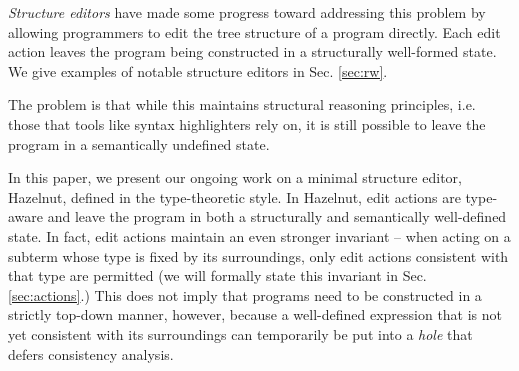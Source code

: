 

\emph{Structure editors} have made some progress toward addressing this
problem by allowing programmers to edit the tree structure of a program
directly. Each edit action leaves the program being constructed in a
structurally well-formed state. We give examples of notable structure editors in Sec. \ref{sec:rw}.  

The problem is that while this maintains structural
reasoning principles, i.e. those that tools like syntax highlighters rely
on, it is still possible to leave the program in a semantically undefined state.


In this paper, we present our ongoing work on a minimal structure editor, Hazelnut,  defined in the type-theoretic style. In Hazelnut, edit actions are type-aware and leave the program in both a structurally and semantically well-defined state. In fact, edit actions maintain an even stronger invariant -- when acting on a subterm whose type is fixed by its surroundings, only edit actions consistent with that type are permitted (we will formally state this invariant in Sec. \ref{sec:actions}.) This does not imply that programs need to be constructed in a strictly top-down manner, however, because a well-defined expression that is not yet consistent with its surroundings can temporarily be put into a \emph{hole} that defers consistency analysis. 

